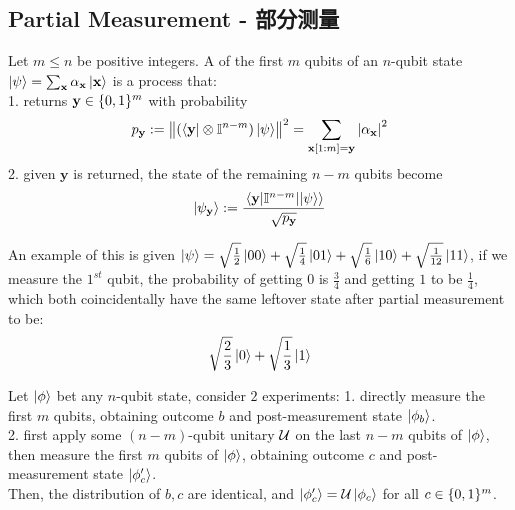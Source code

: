 \subsection{Partial Measurement - 部分测量}
\begin{definition}
    Let $m \le n$ be positive integers. A  of the first $m$ qubits of an $n$-qubit state $\ket{\psi} = \sum_{\mathbf{x}}\alpha_{\mathbf{x}} \ket{\mathbf{x}}$ is a process that: \\
    1. returns $\mathbf{y} \in \{0, 1\}^m$ with probability
    $$p_{\mathbf{y}} := \norm{(\bra{\mathbf{y}} \otimes \mathbb{I}^{n - m})\ket{\psi}}^2 = \sum_{\mathbf{x}[1:m] = \mathbf{y}} \abs{\alpha_{\mathbf{x}}}^2$$
    2. given $\mathbf{y}$ is returned, the state of the remaining $n - m$ qubits become
    $$\ket{\psi_\mathbf{y}} := \frac{\mel{\mathbf{y}}{\mathbb{I}^{n-m}}{\ket{\psi}}}{\sqrt{p_{\mathbf{y}}}}$$
\end{definition}
An example of this is given $\ket{\psi} = \sqrt{\frac{1}{2}} \ket{00} + \sqrt{\frac{1}{4}} \ket{01} + \sqrt{\frac{1}{6}} \ket{10} + \sqrt{\frac{1}{12}} \ket{11}$, if we measure the $1^{st}$ qubit, the probability of getting $0$ is $\frac{3}{4}$ and getting $1$ to be $\frac{1}{4}$, which both coincidentally have the same leftover state after partial measurement to be:
$$\sqrt{\frac{2}{3}}\ket{0} + \sqrt{\frac{1}{3}}\ket{1}$$
\begin{theorem}
    Let $\ket{\phi}$ bet any $n$-qubit state, consider $2$ experiments:
    1. directly measure the first $m$ qubits, obtaining outcome $b$ and post-measurement state $\ket{\phi_b}$. \\
    2. first apply some $(n-m)$-qubit unitary $\mathcal{U}$ on the last $n-m$ qubits of $\ket{\phi}$, then measure the first $m$ qubits of $\ket{\phi}$, obtaining outcome $c$ and post-measurement state $\ket{\phi_c'}$. \\
    Then, the distribution of $b, c$ are identical, and $\ket{\phi_c'} = \mathcal{U} \ket{\phi_c}$ for all $c \in \{0, 1\}^m$.
\end{theorem}

